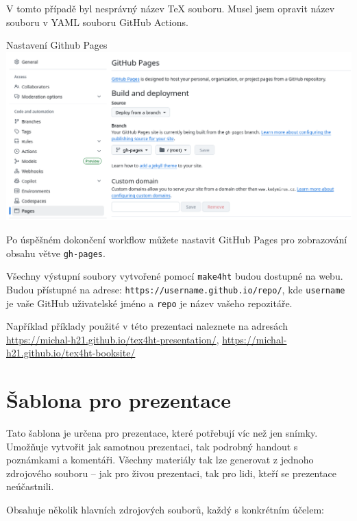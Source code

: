 V tomto případě byl nesprávný název TeX souboru. Musel jsem opravit název
souboru v YAML souboru GitHub Actions.


\begin{frame}[fragile]{Nastavení Github Pages}
\includegraphics[width=\textwidth]{img/github-pages.png}
\end{frame}

Po úspěšném dokončení workflow můžete nastavit GitHub Pages pro zobrazování obsahu větve \texttt{gh-pages}.

Všechny výstupní soubory vytvořené pomocí \texttt{make4ht} budou dostupné na webu.
Budou přístupné na adrese:
\verb|https://username.github.io/repo/|,
kde \texttt{username} je vaše GitHub uživatelské jméno a \texttt{repo} je název vašeho repozitáře.

Například příklady použité v této prezentaci naleznete na adresách \url{https://michal-h21.github.io/tex4ht-presentation/},
\url{https://michal-h21.github.io/tex4ht-booksite/}

\section{Šablona pro prezentace}

Tato šablona je určena pro prezentace, které potřebují víc než jen snímky. Umožňuje vytvořit jak samotnou prezentaci, tak podrobný handout s poznámkami a komentáři. Všechny materiály tak lze generovat z jednoho zdrojového souboru – jak pro živou prezentaci, tak pro lidi, kteří se prezentace neúčastnili.

Obsahuje několik hlavních zdrojových souborů, každý s konkrétním účelem:

